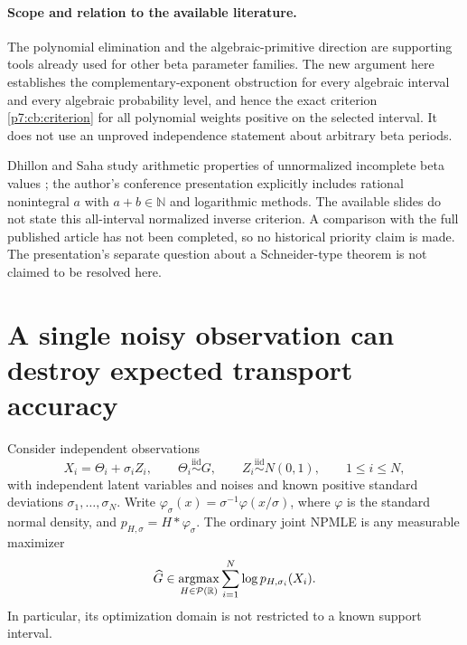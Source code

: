 \documentclass[11pt,a4paper]{article}
\theoremstyle{definition}
\theoremstyle{remark}
\numberwithin{equation}{section}
\begin{document}
\paragraph{Scope and relation to the available literature.}
The polynomial elimination and the algebraic-primitive direction are
supporting tools already used for other beta parameter families.
The new argument here establishes the complementary-exponent obstruction
for every algebraic interval and every algebraic probability level,
and hence the exact criterion \eqref{p7:cb:criterion} for all polynomial
weights positive on the selected interval. It does not use an unproved
independence statement about arbitrary beta periods.

Dhillon and Saha study arithmetic properties of unnormalized incomplete
beta values \cite{p6:bq:DhillonSaha}; the author's conference presentation
\cite{p6:bq:SahaSlides} explicitly includes rational nonintegral $a$ with
$a+b\in\mathbb N$ and logarithmic methods. The available slides do not
state this all-interval normalized inverse criterion. A comparison with
the full published article has not been completed, so no historical
priority claim is made. The presentation's separate question about a
Schneider-type theorem is not claimed to be resolved here.


\clearpage

\section{A single noisy observation can destroy expected transport accuracy}
\label{p7:ho:section}

Consider independent observations
\[
 X_i=\Theta_i+\sigma_i Z_i,\qquad
 \Theta_i\stackrel{\mathrm{iid}}\sim G,\qquad
 Z_i\stackrel{\mathrm{iid}}\sim N(0,1),
 \qquad 1\le i\le N,
\]
with independent latent variables and noises and known positive
standard deviations $\sigma_1,\ldots,\sigma_N$.  Write
$\varphi_\sigma(x)=\sigma^{-1}\varphi(x/\sigma)$, where
$\varphi$ is the standard normal density, and
$p_{H,\sigma}=H*\varphi_\sigma$.  The ordinary joint NPMLE is any
measurable maximizer
\[
 \widehat G\in\mathop{\rm argmax}_{H\in\mathcal P(\mathbb R)}
       \sum_{i=1}^N\log p_{H,\sigma_i}(X_i).
\]
In particular, its optimization domain is not restricted to a known
support interval.
\end{document}
